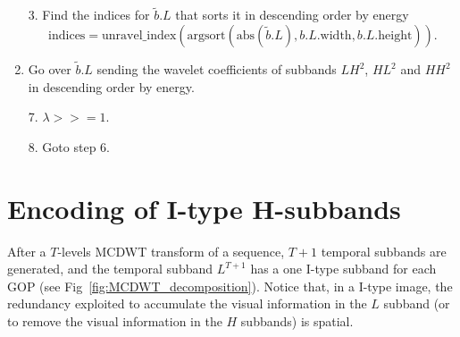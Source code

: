\begin{enumerate}
\item [3.] Find the indices for $\tilde{b}.L$ that sorts it in descending order by energy
  \begin{equation}
    \text{indices}=\text{unravel\_index}(\text{argsort}(\text{abs}(\tilde{b}.L),
    b.L.\text{width}, b.L.\text{height})).
  \end{equation}
\item Go over $\tilde{b}.L$ sending the wavelet coefficients of subbands
  $LH^2$, $HL^2$ and $HH^2$ in descending order by energy.
\item [7.] $\lambda >>= 1$.
\item [8.] Goto step 6.
\end{enumerate}


\section{Encoding of I-type H-subbands}

After a $T$-levels MCDWT transform of a sequence, $T+1$ temporal
subbands are generated, and the temporal subband $L^{T+1}$ has a one
I-type subband for each GOP (see
Fig~\ref{fig:MCDWT_decomposition}). Notice that, in a I-type image,
the redundancy exploited to accumulate the visual information in the
$L$ subband (or to remove the visual information in the $H$ subbands)
is spatial.

